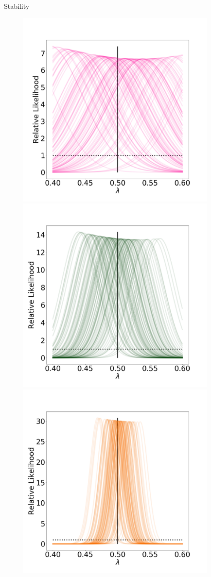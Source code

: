 \vspace{-1cm}

\begin{block}{Stability}

    \begin{figure}
        \includegraphics[width=10cm]{updated_stability_D1_sigma-10E-4}
        \includegraphics[width=10cm]{updated_stability_D10_sigma-10E-4}
        \includegraphics[width=10cm]{updated_stability_D50_sigma-10E-4}

\end{figure}
\end{block}
